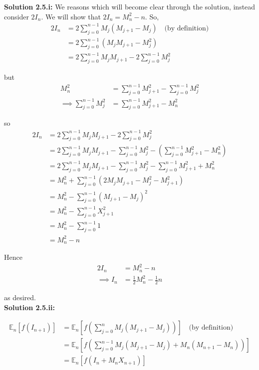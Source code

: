 \documentclass[12pt]{article}
\newcommand{\E}{\mathbb E}
\begin{document}
{\bf Solution 2.5.i:} We reasons which will become clear through the solution, instead consider $2I_n$. We will show that $2I_n = M_n^2 - n$. So,
\begin{align*}
		2I_n &= 2\sum^{n - 1}_{j = 0} M_j(M_{j + 1} - M_j) \quad \text{(by definition)} \\
		&= 2 \sum^{n - 1}_{j = 0} \left( M_jM_{j + 1} - M_j^2 \right) \\
		&= 2\sum^{n - 1}_{j = 0} M_jM_{j + 1} - 2\sum^{n - 1}_{j = 0} M_j^2 
\end{align*}

but
\begin{align*}
	M_n^2 &= \sum^{n - 1}_{j = 0} M_{j + 1}^2 - \sum^{n - 1}_{j = 0} M_j^2 \\
	\implies \sum^{n - 1}_{j = 0} M_j^2 &= \sum^{n - 1}_{j = 0} M_{j + 1}^2 - M_n^2
\end{align*}

so
\begin{align*}
	2I_n &= 2\sum^{n - 1}_{j = 0} M_jM_{j + 1} - 2\sum^{n - 1}_{j = 0} M_j^2  \\
	&= 2\sum^{n - 1}_{j = 0} M_jM_{j + 1} - \sum^{n - 1}_{j = 0}M_j^2 - \left( \sum^{n - 1}_{j = 0} M_{j + 1}^2 - M_n^2 \right) \\
	&= 2\sum^{n - 1}_{j = 0} M_jM_{j + 1} - \sum^{n - 1}_{j = 0}M_j^2 - \sum^{n - 1}_{j = 0} M_{j + 1}^2 + M_n^2 \\
	&= M_n^2 + \sum^{n - 1}_{j = 0} \left( 2M_jM_{j + 1} - M_j^2 - M_{j + 1}^2 \right) \\
	&= M_n^2 - \sum^{n - 1}_{j = 0} \left(M_{j + 1} - M_j \right)^2 \\
	&= M_n^2 - \sum^{n - 1}_{j = 0} X_{j + 1}^2 \\
	&= M_n^2 - \sum^{n - 1}_{j = 0} 1 \\
	&= M_n^2 - n
\end{align*}

Hence
\begin{align*}
	2I_n &= M_n^2 - n \\
	\implies I_n &= \frac{1}{2}M_n^2 - \frac{1}{2}n
\end{align*}

as desired. \\

{\bf Solution 2.5.ii:}

\begin{align*}
	\E_n \left[ f(I_{n + 1}) \right] &= \E_n \left[ f \left( \sum^n_{j = 0} M_j(M_{j + 1} - M_j) \right) \right] \quad \text{(by definition)} \\
	&= \E_n \left[ f \left( \sum^{n - 1}_{j = 0} M_j(M_{j + 1} - M_j) + M_n(M_{n + 1} - M_n) \right) \right] \\
	&= \E_n \left[ f(I_n + M_nX_{n + 1}) \right]
\end{align*}
\end{document}

